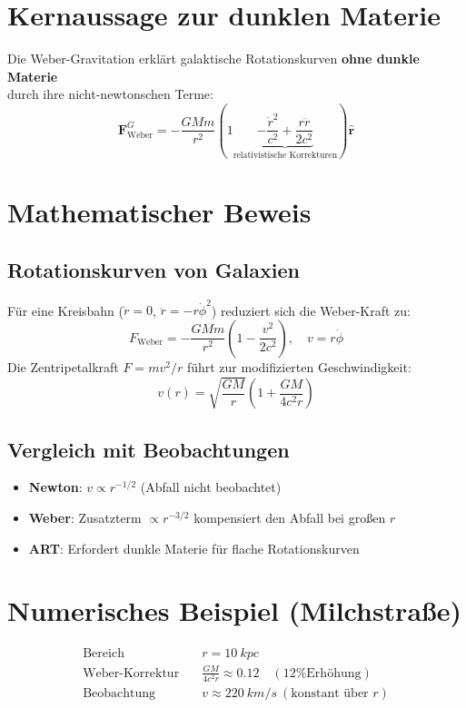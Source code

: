 \section{Kernaussage zur dunklen Materie}
Die Weber-Gravitation erklärt galaktische Rotationskurven \textbf{ohne dunkle Materie}\\durch ihre nicht-newtonschen Terme:
\begin{equation}
\mathbf{F}_{\text{Weber}}^G = -\frac{GMm}{r^2}\left(1 \underbrace{-\frac{\dot{r}^2}{c^2} + \frac{r\ddot{r}}{2c^2}}_{\text{relativistische Korrekturen}}\right)\mathbf{\hat{r}}
\end{equation}

\section*{Mathematischer Beweis}

\subsection*{Rotationskurven von Galaxien}
Für eine Kreisbahn (\(\dot{r}=0\), \(\ddot{r} = -r\dot{\phi}^2\)) reduziert sich die Weber-Kraft zu:
\begin{equation}
F_{\text{Weber}} = -\frac{GMm}{r^2}\left(1 - \frac{v^2}{2c^2}\right), \quad v = r\dot{\phi}
\end{equation}
Die Zentripetalkraft \(F = mv^2/r\) führt zur modifizierten Geschwindigkeit:
\begin{equation}
v(r) = \sqrt{\frac{GM}{r}} \left(1 + \frac{GM}{4c^2r}\right)
\end{equation}

\subsection*{Vergleich mit Beobachtungen}
\begin{itemize}
\item \textbf{Newton}: \(v \propto r^{-1/2}\) (Abfall nicht beobachtet)
\item \textbf{Weber}: Zusatzterm \(\propto r^{-3/2}\) kompensiert den Abfall bei großen \(r\)
\item \textbf{ART}: Erfordert dunkle Materie für flache Rotationskurven \cite{rubin1970}
\end{itemize}

\section*{Numerisches Beispiel (Milchstraße)}
\begin{align*}
\text{Bereich} &\quad r = \SI{10}{kpc} \\
\text{Weber-Korrektur} &\quad \frac{GM}{4c^2r} \approx 0.12 \quad (\text{12\% Erhöhung}) \\
\text{Beobachtung} &\quad v \approx \SI{220}{km/s} \ (\text{konstant über } r)
\end{align*}


